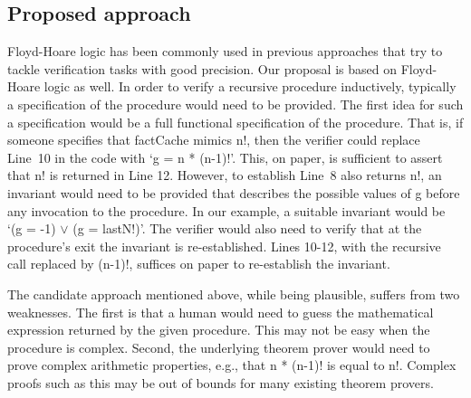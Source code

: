 \subsection{Proposed approach}



Floyd-Hoare logic has been commonly used in previous approaches that try to
tackle verification tasks with good precision. Our proposal is based on
Floyd-Hoare logic as well. In order to verify a recursive procedure
inductively, typically a specification of the procedure would need to be
provided. The first idea for such a specification would be a full
functional specification of the procedure. That is, if someone specifies
that factCache mimics n!, then the verifier could replace Line~10 in the
code with `g = n * (n-1)!'. This, on paper, is sufficient to assert that n!
is returned in Line 12. However, to establish Line~8 also returns n!, an
invariant would need to be provided that describes the possible values of g
before any invocation to the procedure. In our example, a suitable
invariant would be `(g = -1) $\vee$ (g = lastN!)'. The verifier would also
need to verify that at the procedure's exit the invariant is
re-established. Lines 10-12, with the recursive call replaced by (n-1)!,
suffices on paper  to re-establish the invariant.

The candidate approach mentioned above, while being plausible, suffers from
two weaknesses. The first is that a human would need to guess the
mathematical expression returned by the given procedure. This may not be
easy when the procedure is complex. Second, the underlying theorem prover
would need to prove complex arithmetic properties, e.g., that n * (n-1)! is
equal to n!. Complex proofs such as this may be out of bounds for many
existing theorem provers.

